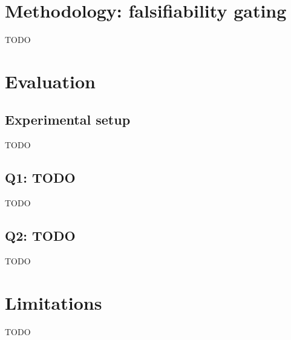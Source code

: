 \documentclass[letterpaper,twocolumn,10pt]{article}
\begin{document}
\section{Methodology: falsifiability gating}
%
%
%
TODO

\section{Evaluation}
%

\subsection{Experimental setup}
TODO

\subsection{Q1: TODO}
TODO

\subsection{Q2: TODO}
TODO

\section{Limitations}
%
TODO
\end{document}
